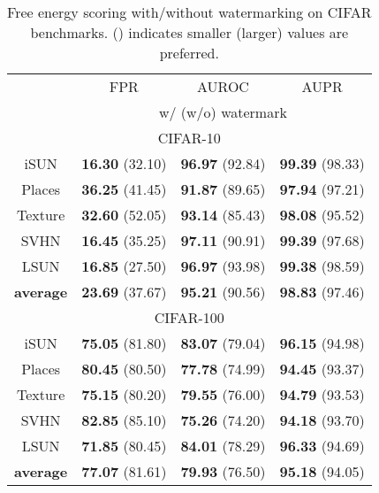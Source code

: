 \documentclass{article}
\begin{document}
\begin{table}[t]
\parbox{.47\linewidth}{
\centering
\caption{Free energy scoring with/without watermarking on CIFAR benchmarks.  () indicates smaller (larger) values are preferred.} \label{tab: free energy}
\vspace{5pt}
\scriptsize{
\begin{tabular}{c|ccc}
\toprule[1.5pt]
                   & FPR      & AUROC        & AUPR       \\
                   \cline{2-4} 
\multirow{-2}{*}{} & \multicolumn{3}{c}{w/ (w/o) watermark} \\
\midrule[0.6pt]
\multicolumn{4}{c}{\cellcolor{greyL}CIFAR-10} \\
\midrule[0.6pt]
iSUN               & \textbf{16.30} (32.10) & \textbf{96.97} (92.84) & \textbf{99.39} (98.33) \\
Places          & \textbf{36.25} (41.45) & \textbf{91.87} (89.65) & \textbf{97.94} (97.21) \\
Texture            & \textbf{32.60} (52.05) & \textbf{93.14} (85.43) & \textbf{98.08} (95.52) \\
SVHN               & \textbf{16.45} (35.25) & \textbf{97.11} (90.91) & \textbf{99.39} (97.68) \\
LSUN             & \textbf{16.85} (27.50) & \textbf{96.97} (93.98) & \textbf{99.38} (98.59) \\
\midrule
\textbf{average}   & \textbf{23.69} (37.67) & \textbf{95.21} (90.56) & \textbf{98.83} (97.46) \\ \midrule[1pt]
\multicolumn{4}{c}{\cellcolor{greyL}CIFAR-100} \\
\midrule[1pt]
iSUN               & \textbf{75.05} (81.80) & \textbf{83.07} (79.04) & \textbf{96.15} (94.98) \\ 
Places          & \textbf{80.45} (80.50) & \textbf{77.78} (74.99) & \textbf{94.45} (93.37) \\
Texture            & \textbf{75.15} (80.20) & \textbf{79.55} (76.00) & \textbf{94.79} (93.53) \\
SVHN               & \textbf{82.85} (85.10) & \textbf{75.26} (74.20) & \textbf{94.18} (93.70) \\
LSUN             & \textbf{71.85} (80.45) & \textbf{84.01} (78.29) & \textbf{96.33} (94.69) \\
\midrule
\textbf{average}   & \textbf{77.07} (81.61) & \textbf{79.93} (76.50) & \textbf{95.18} (94.05) \\ \bottomrule[1.5pt]      
\end{tabular}
}}
\end{table}
\end{document}
